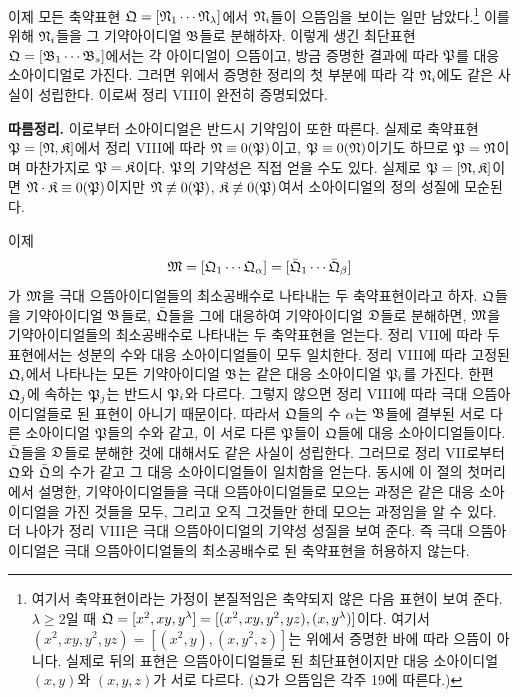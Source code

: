 이제 모든 축약표현 $\mathfrak{Q}=[\mathfrak{N}_1\cdots\mathfrak{N}_\lambda]$에서 $\mathfrak{N}_i$들이 으뜸임을 보이는 일만 남았다.\footnote{여기서 축약표현이라는 가정이 본질적임은 축약되지 않은 다음 표현이 보여 준다. $\lambda\ge2$일 때 $\mathfrak{Q}=[x^2,xy,y^\lambda]=[(x^2,xy,y^2,yz),(x,y^\lambda)]$이다. 여기서 $(x^2,xy,y^2,yz)=[(x^2,y),(x,y^2,z)]$는 위에서 증명한 바에 따라 으뜸이 아니다. 실제로 뒤의 표현은 으뜸아이디얼들로 된 최단표현이지만 대응 소아이디얼 $(x,y)$와 $(x,y,z)$가 서로 다르다. ($\mathfrak{Q}$가 으뜸임은 각주 19에 따른다.)} 이를 위해 $\mathfrak{N}_i$들을 그 기약아이디얼 $\mathfrak{B}$들로 분해하자. 이렇게 생긴 최단표현 $\mathfrak{Q}=[\mathfrak{B}_1\cdots\mathfrak{B}_s]$에서는 각 아이디얼이 으뜸이고, 방금 증명한 결과에 따라 $\mathfrak{P}$를 대응 소아이디얼로 가진다. 그러면 위에서 증명한 정리의 첫 부분에 따라 각 $\mathfrak{N}_i$에도 같은 사실이 성립한다. 이로써 정리 VIII이 완전히 증명되었다.

\textbf{따름정리.} 이로부터 소아이디얼은 반드시 기약임이 또한 따른다. 실제로 축약표현 $\mathfrak{P}=[\mathfrak{N},\mathfrak{K}]$에서 정리 VIII에 따라 $\mathfrak{N}\equiv0(\mathfrak{P})$이고, $\mathfrak{P}\equiv0(\mathfrak{N})$이기도 하므로 $\mathfrak{P}=\mathfrak{N}$이며 마찬가지로 $\mathfrak{P}=\mathfrak{K}$이다. $\mathfrak{P}$의 기약성은 직접 얻을 수도 있다. 실제로 $\mathfrak{P}=[\mathfrak{N},\mathfrak{K}]$이면 $\mathfrak{N}\cdot\mathfrak{K}\equiv0(\mathfrak{P})$이지만 $\mathfrak{N}\not\equiv0(\mathfrak{P})$, $\mathfrak{K}\not\equiv0(\mathfrak{P})$여서 소아이디얼의 정의 성질에 모순된다.

이제
\[
 \mathfrak{M}=[\mathfrak{Q}_1\cdots\mathfrak{Q}_\alpha]
          =[\bar{\mathfrak{Q}}_1\cdots\bar{\mathfrak{Q}}_\beta]
\]
가 $\mathfrak{M}$을 극대 으뜸아이디얼들의 최소공배수로 나타내는 두 축약표현이라고 하자. $\mathfrak{Q}$들을 기약아이디얼 $\mathfrak{B}$들로, $\bar{\mathfrak{Q}}$들을 그에 대응하여 기약아이디얼 $\mathfrak{D}$들로 분해하면, $\mathfrak{M}$을 기약아이디얼들의 최소공배수로 나타내는 두 축약표현을 얻는다. 정리 VII에 따라 두 표현에서는 성분의 수와 대응 소아이디얼들이 모두 일치한다. 정리 VIII에 따라 고정된 $\mathfrak{Q}_i$에서 나타나는 모든 기약아이디얼 $\mathfrak{B}$는 같은 대응 소아이디얼 $\mathfrak{P}_i$를 가진다. 한편 $\mathfrak{Q}_j$에 속하는 $\mathfrak{P}_j$는 반드시 $\mathfrak{P}_i$와 다르다. 그렇지 않으면 정리 VIII에 따라 극대 으뜸아이디얼들로 된 표현이 아니기 때문이다. 따라서 $\mathfrak{Q}$들의 수 $\alpha$는 $\mathfrak{B}$들에 결부된 서로 다른 소아이디얼 $\mathfrak{P}$들의 수와 같고, 이 서로 다른 $\mathfrak{P}$들이 $\mathfrak{Q}$들에 대응 소아이디얼들이다. $\bar{\mathfrak{Q}}$들을 $\mathfrak{D}$들로 분해한 것에 대해서도 같은 사실이 성립한다. 그러므로 정리 VII로부터 $\mathfrak{Q}$와 $\bar{\mathfrak{Q}}$의 수가 같고 그 대응 소아이디얼들이 일치함을 얻는다. 동시에 이 절의 첫머리에서 설명한, 기약아이디얼들을 극대 으뜸아이디얼들로 모으는 과정은 같은 대응 소아이디얼을 가진 것들을 모두, 그리고 오직 그것들만 한데 모으는 과정임을 알 수 있다. 더 나아가 정리 VIII은 극대 으뜸아이디얼의 기약성 성질을 보여 준다. 즉 극대 으뜸아이디얼은 극대 으뜸아이디얼들의 최소공배수로 된 축약표현을 허용하지 않는다.

